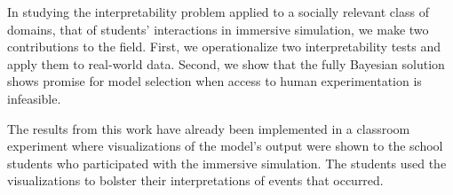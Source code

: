 \documentclass[letterpaper]{article} %
\newcommand{\kibitz}[2]{\ifnum\Comments=1{\textcolor{#1}{#2}}\fi}
\newcommand{\nh}[1]{\kibitz{blue}{[NH:#1]}}
\newcommand{\kg}[1]{\kibitz{red}{[KG:#1]}}
\begin{document}



In studying the interpretability problem applied to a socially relevant class of domains, that of students' interactions in immersive simulation, we make two contributions to the field.
First, we operationalize two interpretability tests and apply them to real-world data. 
Second, we show that the fully Bayesian solution shows promise for model selection when access to human experimentation is infeasible. 

The results from this work have already been implemented in a classroom experiment where visualizations of the model's output were shown to the school students who participated with the immersive simulation. The students used the visualizations to bolster their interpretations of events that occurred.
\end{document}
